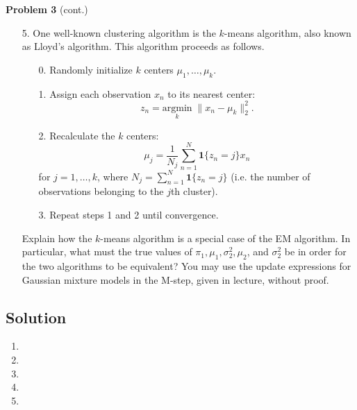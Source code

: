 \documentclass[submit]{harvardml}
\begin{document}
\newpage

\begin{framed}
\noindent\textbf{Problem 3} (cont.)\\
\begin{enumerate}
\item[5.] One well-known clustering algorithm is the $k$-means algorithm, also known as Lloyd's algorithm. This algorithm proceeds as follows.
\begin{enumerate}
    \item[0.] Randomly initialize $k$ centers $ \mu_1, \dots, \mu_k$.
    \item[1.] Assign each observation $x_n$ to its nearest center:
    $$
    z_n = \underset{k}{\text{argmin}}\;\|x_n - \mu_k\|_2^2.
    $$
    \item[2.] Recalculate the $k$ centers:
    $$
    \mu_j = \frac{1}{N_j}\sum_{n = 1}^N\mathbf{1}\{z_n = j\}x_n
    $$
    for $j = 1, \dots, k$, where $N_j = \sum_{n = 1}^N\mathbf{1}\{z_n = j\}$ (i.e. the number of observations belonging to the $j$th cluster).
    \item[3.] Repeat steps 1 and 2 until convergence.
\end{enumerate}
Explain how the $k$-means algorithm is a special case of the EM algorithm. In particular, what must the true values of $\pi_1, \mu_1, \sigma_2^2, \mu_2$, and $\sigma_2^2$ be in order for the two algorithms to be equivalent? You may use the update expressions for Gaussian mixture models in the M-step, given in lecture, without proof.
\end{enumerate}
\end{framed}

\newpage 

\subsection*{Solution}
\begin{enumerate}
  \item 
  \item 
  \item 
  \item 
  \item 
\end{enumerate}
\end{document}
